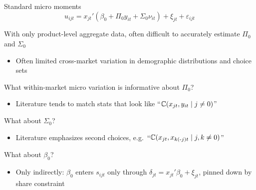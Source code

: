 \begin{frame}[label=standard]{Standard micro moments}
    \begin{equation*}
        u_{ijt} = x_{jt}'(\beta_0 + \Pi_0 y_{it} + \Sigma_0 \nu_{it}) + \xi_{jt} + \varepsilon_{ijt}
    \end{equation*}
    
    \begin{wideitemize}
        \item With only product-level aggregate data, often difficult to accurately estimate $\Pi_0$ and $\Sigma_0$
        \begin{itemize}
            \item Often limited \alert{cross-market variation} in demographic distributions and choice sets
        \end{itemize}
        
        \item What \alert{within-market} micro variation is informative about $\Pi_0$?
        \begin{itemize}
            \item Literature tends to match stats that look like ``$\mathbb{C}(x_{jt}, y_{it} \mid j \neq 0)$''
        \end{itemize}
        
        \item What about $\Sigma_0$?
        \begin{itemize}
            \item Literature emphasizes \alert{second choices}, e.g.\ ``$\mathbb{C}(x_{jt}, x_{k(\text{-}j)t} \mid j, k \neq 0)$''
        \end{itemize}
        
        \item What about $\beta_0$?
        \begin{itemize}
            \item Only \alert{indirectly}: $\beta_0$ enters $s_{ijt}$ only through $\delta_{jt} = x_{jt}'\beta_0 + \xi_{jt}$, pinned down by share constraint
        \end{itemize}
    \end{wideitemize}
\end{frame}


